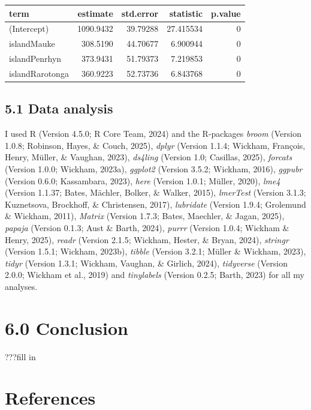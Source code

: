 \documentclass[
  ,man,floatsintext]{apa6}
\begin{document}
\begin{tabular}{l|r|r|r|r}
\hline
term & estimate & std.error & statistic & p.value\\
\hline
(Intercept) & 1090.9432 & 39.79288 & 27.415534 & 0\\
\hline
islandMauke & 308.5190 & 44.70677 & 6.900944 & 0\\
\hline
islandPenrhyn & 373.9431 & 51.79373 & 7.219853 & 0\\
\hline
islandRarotonga & 360.9223 & 52.73736 & 6.843768 & 0\\
\hline
\end{tabular}

\subsection{5.1 Data analysis}\label{data-analysis}

I used R (Version 4.5.0; R Core Team, 2024) and the R-packages \emph{broom} (Version 1.0.8; Robinson, Hayes, \& Couch, 2025), \emph{dplyr} (Version 1.1.4; Wickham, François, Henry, Müller, \& Vaughan, 2023), \emph{ds4ling} (Version 1.0; Casillas, 2025), \emph{forcats} (Version 1.0.0; Wickham, 2023a), \emph{ggplot2} (Version 3.5.2; Wickham, 2016), \emph{ggpubr} (Version 0.6.0; Kassambara, 2023), \emph{here} (Version 1.0.1; Müller, 2020), \emph{lme4} (Version 1.1.37; Bates, Mächler, Bolker, \& Walker, 2015), \emph{lmerTest} (Version 3.1.3; Kuznetsova, Brockhoff, \& Christensen, 2017), \emph{lubridate} (Version 1.9.4; Grolemund \& Wickham, 2011), \emph{Matrix} (Version 1.7.3; Bates, Maechler, \& Jagan, 2025), \emph{papaja} (Version 0.1.3; Aust \& Barth, 2024), \emph{purrr} (Version 1.0.4; Wickham \& Henry, 2025), \emph{readr} (Version 2.1.5; Wickham, Hester, \& Bryan, 2024), \emph{stringr} (Version 1.5.1; Wickham, 2023b), \emph{tibble} (Version 3.2.1; Müller \& Wickham, 2023), \emph{tidyr} (Version 1.3.1; Wickham, Vaughan, \& Girlich, 2024), \emph{tidyverse} (Version 2.0.0; Wickham et al., 2019) and \emph{tinylabels} (Version 0.2.5; Barth, 2023) for all my analyses.

\section{6.0 Conclusion}\label{conclusion}

???fill in

\section{References}\label{references}
\end{document}
